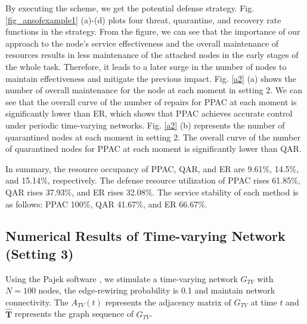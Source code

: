 \documentclass[lettersize,journal]{IEEEtran}
\begin{document}
By executing the scheme, we get the potential defense strategy. Fig. \ref{fig_ansofexample1} (a)-(d) plots four threat, quarantine, and recovery rate functions in the strategy. From the figure, we can see that the importance of our approach to the node's service effectiveness and the overall maintenance of resources results in less maintenance of the attacked nodes in the early stages of the whole task. Therefore, it leads to a later surge in the number of nodes to maintain effectiveness and mitigate the previous impact. Fig. \ref{a2} (a) shows the number of overall maintenance for the node at each moment in setting 2. We can see that the overall curve of the number of repairs for PPAC at each moment is significantly lower than ER, which shows that PPAC achieves accurate control under periodic time-varying networks. Fig. \ref{a2} (b) represents the number of quarantined nodes at each moment in setting 2. The overall curve of the number of quarantined nodes for PPAC at each moment is significantly lower than QAR.

\par

In summary, the resource occupancy of PPAC, QAR, and ER are 9.61$\%$, 14.5$\%$, and 15.14$\%$, respectively. The defense resource utilization of PPAC rises 61.85$\%$, QAR rises 37.93$\%$, and ER rises 32.08$\%$. The service stability of each method is as follows: PPAC 100$\%$, QAR 41.67$\%$, and ER 66.67$\%$.
\subsection{Numerical Results of Time-varying Network (Setting 3)}\label{time-varying network}
Using the Pajek software \cite{de2018exploratory}, we stimulate a time-varying network $G_{TV}$ with $N = 100$ nodes, the edge-rewiring probability is 0.1 and maintain network connectivity. The $A_{TV}(t)$ represents the adjacency matrix of $G_{TV}$ at time $t$ and $\bm{\hat{T}}$ represents the graph sequence of $G_{TV}$.\par
\end{document}
